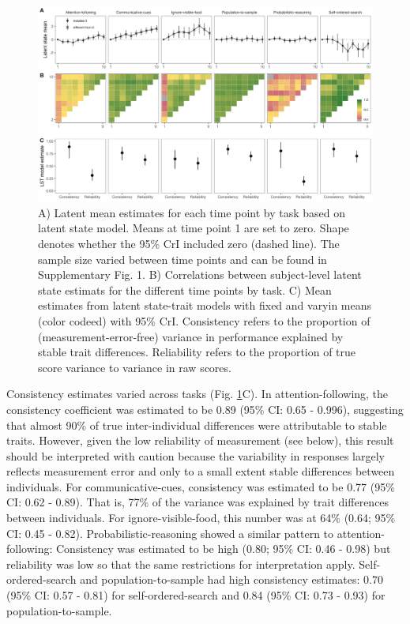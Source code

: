 \documentclass[
  man,floatsintext]{apa6}
\begin{document}
\begin{figure}

{\centering \includegraphics[width=1\linewidth]{../visuals/ls_lst} 

}

\caption{A) Latent mean estimates for each time point by task based on latent state model. Means at time point 1 are set to zero. Shape denotes whether the 95\% CrI included zero (dashed line). The sample size varied between time points and can be found in Supplementary Fig. 1.  B) Correlations between subject-level latent state estimats for the different time points by task. C) Mean estimates from latent state-trait models with fixed and varyin means (color codeed) with 95\% CrI. Consistency refers to the proportion of (measurement-error-free) variance in performance explained by stable trait differences. Reliability refers to the proportion of true score variance to variance in raw scores.}\label{fig:figsem}
\end{figure}

Consistency estimates varied across tasks (Fig. \ref{fig:figsem}C). In attention-following, the consistency coefficient was estimated to be 0.89 (95\% CI: 0.65 - 0.996), suggesting that almost 90\% of true inter-individual differences were attributable to stable traits. However, given the low reliability of measurement (see below), this result should be interpreted with caution because the variability in responses largely reflects measurement error and only to a small extent stable differences between individuals. For communicative-cues, consistency was estimated to be 0.77 (95\% CI: 0.62 - 0.89). That is, 77\% of the variance was explained by trait differences between individuals. For ignore-visible-food, this number was at 64\% (0.64; 95\% CI: 0.45 - 0.82). Probabilistic-reasoning showed a similar pattern to attention-following: Consistency was estimated to be high (0.80; 95\% CI: 0.46 - 0.98) but reliability was low so that the same restrictions for interpretation apply. Self-ordered-search and population-to-sample had high consistency estimates: 0.70 (95\% CI: 0.57 - 0.81) for self-ordered-search and 0.84 (95\% CI: 0.73 - 0.93) for population-to-sample.
\end{document}
